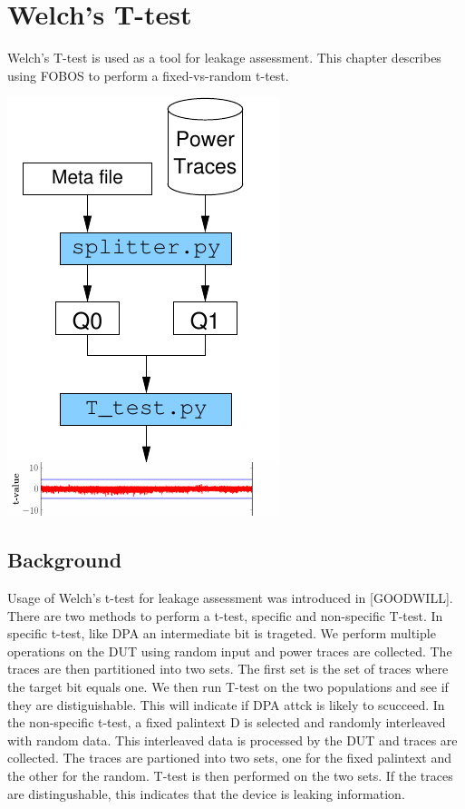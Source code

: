  \chapter{Welch's T-test} \label{chap:fobos-t-test}
 
Welch’s T-test is used as a tool for leakage assessment. This chapter describes using FOBOS to perform a fixed-vs-random t-test.
\begin{center}
\includegraphics[scale=1]{../figures/t-test-flow}
\end{center}

\section{Background}

Usage of Welch's t-test for leakage assessment was introduced in [GOODWILL].
There are two methods to perform a t-test, specific and non-specific T-test.
In specific t-test, like DPA an intermediate bit is trageted. We perform multiple operations on the DUT using random input and power traces are collected.
The traces are then partitioned into two sets. The first set is the set of traces where the target bit equals one. 
We then run T-test on the two populations and see if they are distiguishable. This will indicate if DPA attck is likely to scucceed.
In the non-specific t-test, a fixed palintext D is selected and randomly interleaved with random data. This interleaved data is processed by the DUT and traces are collected. 
The traces are partioned into two sets, one for the fixed palintext and the other for the random. T-test is then performed on the two sets. 
If the traces are distingushable, this indicates that the device is leaking information.

